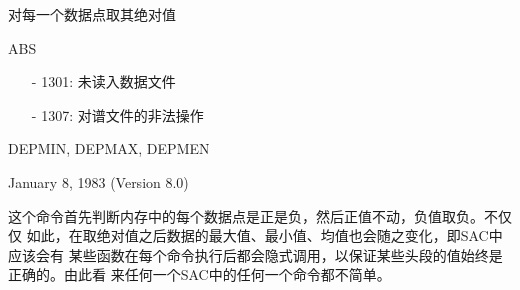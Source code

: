 \label{cmd:abs}

对每一个数据点取其绝对值

ABS

\begin{itemize}
\item[-]1301: 未读入数据文件
\item[-]1307: 对谱文件的非法操作
\end{itemize}

DEPMIN, DEPMAX, DEPMEN

January 8, 1983 (Version 8.0)

这个命令首先判断内存中的每个数据点是正是负，然后正值不动，负值取负。不仅仅
如此，在取绝对值之后数据的最大值、最小值、均值也会随之变化，即SAC中应该会有
某些函数在每个命令执行后都会隐式调用，以保证某些头段的值始终是正确的。由此看
来任何一个SAC中的任何一个命令都不简单。
